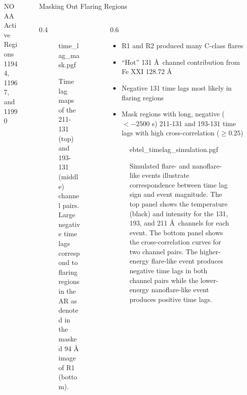 \documentclass[final]{beamer}
\newlength{\sepwidth}
\newlength{\colwidth}
\newcommand{\separatorcolumn}{\begin{column}{\sepwidth}\end{column}}
\begin{document}
\begin{frame}[t]
\begin{columns}[t]
\begin{column}{\colwidth}
\begin{block}{NOAA Active Regions 11944, 11967, and 11990}
  \end{block}

\end{column}
\separatorcolumn  
\begin{column}{\colwidth}

  \begin{block}{Masking Out Flaring Regions}

    \begin{columns}[c]
      \begin{column}{0.4\colwidth}
        \begin{figure}
          \centering
          {time_lag_mask.pgf}
          \caption{Time lag maps of the 211-131 (top) and 193-131 (middle) channel pairs. Large negative time lags correspond to flaring regions in the AR as denoted in the masked 94 \AA\, image of \textcolor{C0}{R1} (bottom).} 
          \label{fig:flare_masked_maps}
        \end{figure}
      \end{column}
      \begin{column}{0.6\colwidth}
        \begin{itemize}
          \item \textcolor{C0}{R1} and \textcolor{C1}{R2} produced many C-class flares
          \item ``Hot'' 131 \AA\, channel contribution from Fe XXI 128.72 \AA\,
          \item Negative 131 time lags most likely in flaring regions
          \item Mask regions with long, negative ($< -2500$ s) 211-131 and 193-131 time lags with high cross-correlation ($\ge0.25$)
        \end{itemize}
        \begin{figure}
          \centering
          {ebtel_timelag_simulation.pgf}
          \caption{Simulated flare- and nanoflare-like events illustrate correspondence between time lag sign and event magnitude. The top panel shows the temperature (black) and intensity for the \textcolor{C3}{131}, \textcolor{C4}{193}, and \textcolor{C5}{211} \AA\, channels for each event. The bottom panel shows the cross-correlation curves for two channel pairs. The higher-energy flare-like event produces negative time lags in both channel pairs while the  lower-energy nanoflare-like event produces positive time lags.} 
          \label{fig:ebtel_timelag}
        \end{figure}
      \end{column}
    \end{columns}


\end{block}
\end{column}
\end{columns}
\end{frame}
\end{document}
